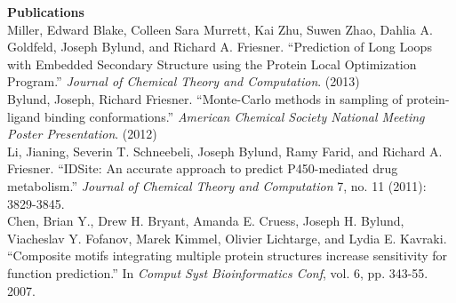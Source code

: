 \vspace{\mybigskip}
\vspace{\mybigskip}
\myfontsize{\littleheader}
\textbf{Publications}\\
\myfontsize{\bodysize}
\vspace{1ex}
Miller, Edward Blake, Colleen Sara Murrett, Kai Zhu, Suwen Zhao, Dahlia A. Goldfeld, Joseph Bylund, and Richard A. Friesner. “Prediction of Long Loops with Embedded Secondary Structure using the Protein Local Optimization Program.” \textit{Journal of Chemical Theory and Computation}. (2013)\\
\vspace{1ex}
Bylund, Joseph, Richard Friesner. “Monte-Carlo methods in sampling of protein-ligand binding conformations.” \textit{American Chemical Society National Meeting Poster Presentation}. (2012)\\
\vspace{1ex}
Li, Jianing, Severin T. Schneebeli, Joseph Bylund, Ramy Farid, and Richard A. Friesner. “IDSite: An accurate approach to predict P450-mediated drug metabolism.” \textit{Journal of Chemical Theory and Computation} 7, no. 11 (2011): 3829-3845.\\
\vspace{1ex}
Chen, Brian Y., Drew H. Bryant, Amanda E. Cruess, Joseph H. Bylund, Viacheslav Y. Fofanov, Marek Kimmel, Olivier Lichtarge, and Lydia E. Kavraki. “Composite motifs integrating multiple protein structures increase sensitivity for function prediction.” In \textit{Comput Syst Bioinformatics Conf}, vol. 6, pp. 343-55. 2007.\\

%
%
